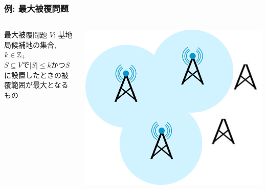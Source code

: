 \documentclass[14pt,aspectratio=169,xcolor=dvipsnames,table,onlytextwidth,dvipdfmx]{beamer}
\begin{document}
\begin{frame}[t,label=maxcoverage]
    \frametitle{例: 最大被覆問題}

    \begin{columns}[T]
    \begin{column}{.55\textwidth}
        \begin{block}{最大被覆問題}
             $V$: 基地局候補地の集合, $k \in \mathbb{Z}_+$ \\
             $S \subseteq V$で$|S| \leq k$かつ$S$に設置したときの被覆範囲が最大となるもの
        \end{block}
    \end{column}
    \begin{column}{.40\textwidth}
    \centering
    \includegraphics[width=\linewidth]{figs/coverage.pdf}
    \end{column}
    \end{columns}

\end{frame}
\end{document}
